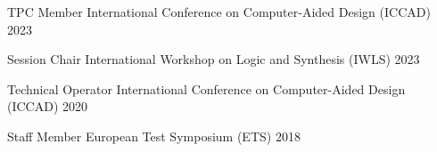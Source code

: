 \begin{cvhonors}
  \cvhonor
    {TPC Member} %
    {International Conference on Computer-Aided Design (ICCAD)} %
    {} %
    {2023} %

  \cvhonor
    {Session Chair} %
    {International Workshop on Logic and Synthesis (IWLS)} %
    {} %
    {2023} %

  \cvhonor
    {Technical Operator} %
    {International Conference on Computer-Aided Design (ICCAD)} %
    {} %
    {2020} %

  \cvhonor
    {Staff Member} %
    {European Test Symposium (ETS)} %
    {} %
    {2018} %

\end{cvhonors}
\vspace{3.5mm}



